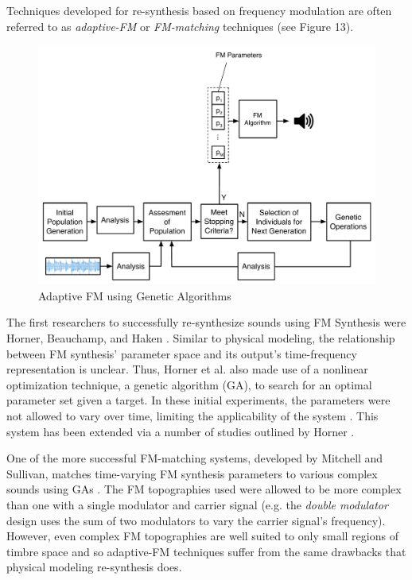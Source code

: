 \documentclass[12pt]{report} 	%
\numberwithin{figure}{chapter}
\numberwithin{table}{chapter}
\numberwithin{equation}{chapter}
\begin{document}
\begin{flushleft}
Techniques developed for re-synthesis based on frequency modulation are often referred to as \textit{adaptive-FM} or \textit{FM-matching} techniques (see Figure 13). 
\begin{figure}[h!]
\begin{center}
\includegraphics[scale=0.50]{AdaptiveFM}
\caption[Adaptive FM]{Adaptive FM using Genetic Algorithms}
\end{center}
\vspace{6pt}
\end{figure}
The first researchers to successfully re-synthesize sounds using FM Synthesis were Horner, Beauchamp, and Haken \cite{Horner:1993il}. Similar to physical modeling, the relationship between FM synthesis' parameter space and its output's time-frequency representation is unclear. Thus, Horner et al. also made use of a nonlinear optimization technique, a genetic algorithm (GA), to search for an optimal parameter set given a target. In these initial experiments, the parameters were not allowed to vary over time, limiting the applicability of the system \cite[p. 22]{Horner:1993il}. This system has been extended via a number of studies outlined by Horner \cite{Horner:2003ov}. 

One of the more successful FM-matching systems, developed by Mitchell and Sullivan, matches time-varying FM synthesis parameters to various complex sounds using GAs \cite{Mitchell:2005ez}. The FM topographies used were allowed to be more complex than one with a single modulator and carrier signal (e.g. the \textit{double modulator} design uses the sum of two modulators to vary the carrier signal's frequency). However, even complex FM topographies are well suited to only small regions of timbre space and so adaptive-FM techniques suffer from the same drawbacks that physical modeling re-synthesis does.
\vspace{12pt}

\end{flushleft}
\end{document}
